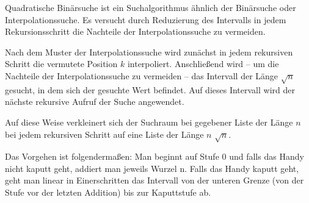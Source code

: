 \documentclass{lehramt-informatik-aufgabe}
\begin{document}
\begin{enumerate}
\begin{liExkurs}
Quadratische Binärsuche ist ein Suchalgorithmus ähnlich der Binärsuche
oder Interpolationssuche. Es versucht durch Reduzierung des Intervalls
in jedem Rekursionsschritt die Nachteile der Interpolationssuche zu
vermeiden.

Nach dem Muster der Interpolationssuche wird zunächst in jedem
rekursiven Schritt die vermutete Position $k$ interpoliert. Anschließend
wird – um die Nachteile der Interpolationssuche zu vermeiden – das
Intervall der Länge $\sqrt{n}$ gesucht, in
dem sich der gesuchte Wert befindet. Auf dieses Intervall wird der
nächste rekursive Aufruf der Suche angewendet.

Auf diese Weise verkleinert sich der Suchraum bei gegebener Liste der
Länge $n$ bei jedem rekursiven Schritt auf eine Liste der Länge $n$
$\sqrt n$.
\end{liExkurs}

\begin{liAntwort}
Das Vorgehen ist folgendermaßen: Man beginnt auf Stufe 0 und falls das
Handy nicht kaputt geht, addiert man jeweils Wurzel n. Falls das Handy
kaputt geht, geht man linear in Einerschritten das Intervall von der
unteren Grenze (\dh von der Stufe vor der letzten Addition) bis zur
Kaputtstufe ab.

\end{liAntwort}

\end{enumerate}
\end{document}

